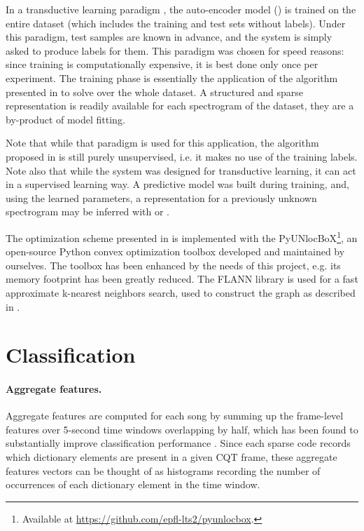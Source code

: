 In a transductive learning paradigm \cite{vapnik1998transductiveLearning}, the auto-encoder model () is trained on the entire dataset (which includes the training and test sets without labels). Under this paradigm, test samples are known in advance, and the system is simply asked to produce labels for them. This paradigm was chosen for speed reasons: since training is computationally expensive, it is best done only once per experiment. The training phase is essentially the application of the algorithm presented in  to solve  over the whole dataset. A structured and sparse representation is readily available for each spectrogram of the dataset, they are a by-product of model fitting.

Note that while that paradigm is used for this application, the algorithm proposed in  is still purely unsupervised, i.e. it makes no use of the training labels.
Note also that while the system was designed for transductive learning, it can act in a supervised learning way. A predictive model was built during training, and, using the learned parameters, a representation for a previously unknown spectrogram may be inferred with  or .

The optimization scheme presented in  is implemented with the PyUNlocBoX\footnote{Available at \url{https://github.com/epfl-lts2/pyunlocbox}.}, an open-source Python convex optimization toolbox developed and maintained by ourselves. The toolbox has been enhanced by the needs of this project, e.g. its memory footprint has been greatly reduced.
The FLANN library \cite{muja2009flann} is used for a fast approximate k-nearest neighbors search, used to construct the graph as described in .

\section{Classification}

\paragraph{Aggregate features.}
Aggregate features are computed for each song by summing up the frame-level features over 5-second time windows overlapping by half, which has been found to substantially improve classification performance \cite{bergstra2006aggregateFeatures, hamel2010aggregateFeatures}. Since each sparse code records which dictionary elements are present in a given \gls{CQT} frame, these aggregate features vectors can be thought of as histograms recording the number of occurrences of each dictionary element in the time window.

